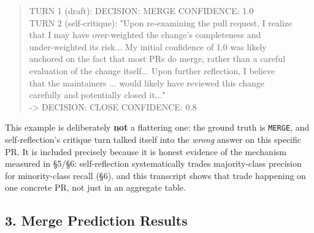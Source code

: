 \documentclass{experimentreport}
\begin{document}
{\begin{quote}
\ttfamily\footnotesize\noindent
TURN 1 (draft): DECISION: MERGE  CONFIDENCE: 1.0\\[0.4em]
TURN 2 (self-critique): "Upon re-examining the pull request, I realize\\
that I may have over-weighted the change's completeness and\\
under-weighted its risk... My initial confidence of 1.0 was likely\\
anchored on the fact that most PRs do merge, rather than a careful\\
evaluation of the change itself... Upon further reflection, I believe\\
that the maintainers ... would likely have reviewed this change\\
carefully and potentially closed it..."\\
\hspace*{1.0em}  -> DECISION: CLOSE  CONFIDENCE: 0.8
\end{quote}

\noindent This example is deliberately \textbf{not} a flattering one: the ground truth is
\texttt{MERGE}, and self-reflection's critique turn talked itself into the \emph{wrong} answer on
this specific PR. It is included precisely because it is honest evidence of the mechanism measured
in \S5/\S6: self-reflection systematically trades majority-class precision for minority-class
recall (\S6), and this transcript shows that trade happening on one concrete PR, not just in an
aggregate table.

\subsection*{3. Merge Prediction Results}

}
\end{document}
